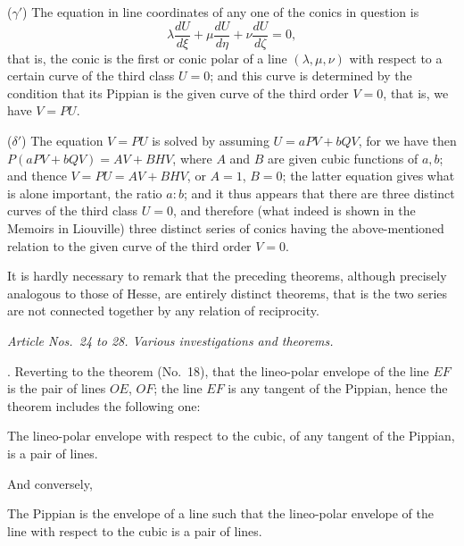 \documentclass[11pt]{article}
\begin{document}
($\gamma'$) The equation in line coordinates of any one of the conics in question is
\[
\lambda\frac{dU}{d\xi} + \mu\frac{dU}{d\eta} + \nu\frac{dU}{d\zeta} = 0,
\]
that is, the conic is the first or conic polar of a line $(\lambda, \mu, \nu)$ with respect to a certain curve of the third class $U = 0$; and this curve is determined by the condition that its Pippian is the given curve of the third order $V = 0$, that is, we have $V = PU$.

($\delta'$) The equation $V = PU$ is solved by assuming $U = a P V + b Q V$, for we have then $P(a P V + b Q V) = A V + B H V$, where $A$ and $B$ are given cubic functions of $a, b$; and thence $V = PU = A V + B H V$, or $A = 1$, $B = 0$; the latter equation gives what is alone important, the ratio $a : b$; and it thus appears that there are three distinct curves of the third class $U = 0$, and therefore (what indeed is shown in the Memoirs in Liouville) three distinct series of conics having the above-mentioned relation to the given curve of the third order $V = 0$.

It is hardly necessary to remark that the preceding theorems, although precisely analogous to those of Hesse, are entirely distinct theorems, that is the two series are not connected together by any relation of reciprocity.

\medskip

\textit{Article Nos.~24 to 28. Various investigations and theorems.}

\medskip

. Reverting to the theorem (No.~18), that the lineo-polar envelope of the line $EF$ is the pair of lines $OE$, $OF$; the line $EF$ is any tangent of the Pippian, hence the theorem includes the following one:

The lineo-polar envelope with respect to the cubic, of any tangent of the Pippian, is a pair of lines.

And conversely,

The Pippian is the envelope of a line such that the lineo-polar envelope of the line with respect to the cubic is a pair of lines.
\end{document}
